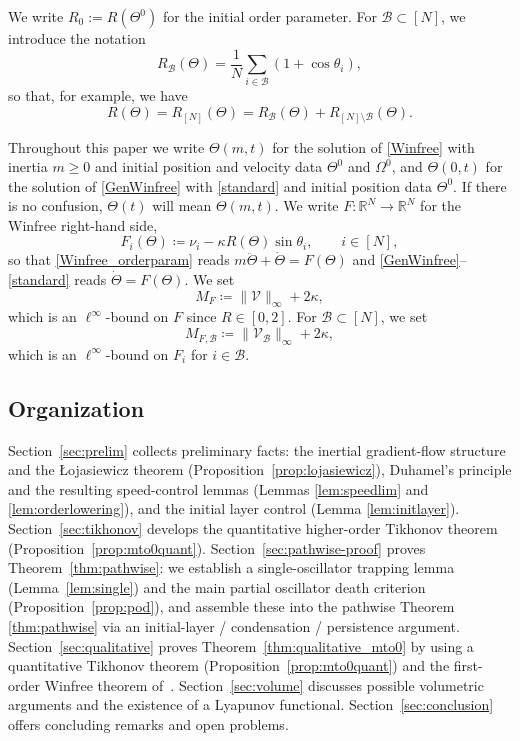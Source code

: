 \documentclass[11pt,reqno]{amsart}
\newcommand{\R}{\mathbb{R}}
\theoremstyle{definition}
\theoremstyle{remark}
\begin{document}
We write $R_0:=R(\Theta^0)$ for the initial order parameter. For $\mathcal{B}\subset [N]$, we introduce the notation
\[
R_\mathcal{B}(\Theta)=\frac 1N\sum_{i\in \mathcal{B}}(1+\cos\theta_i),
\]
so that, for example, we have
\begin{equation}\label{eq:order-parameter-split}
R(\Theta) = R_{[N]}(\Theta)= R_\mathcal{B}(\Theta) + R_{[N]\setminus \mathcal{B}}(\Theta).
\end{equation}

Throughout this paper we write $\Theta(m,t)$ for the solution of
\eqref{Winfree} with inertia $m\ge0$ and initial position and velocity data $\Theta^0$ and $\Omega^0$, and $\Theta(0,t)$ for the solution
of \eqref{GenWinfree} with \eqref{standard} and initial position data $\Theta^0$.  If there is no confusion, $\Theta(t)$ will mean $\Theta(m,t)$. We write
$F\colon\R^N\to\R^N$ for the Winfree right-hand side,
\begin{equation}\label{def:F}
F_i(\Theta)\coloneqq\nu_i-\kappa R(\Theta)\sin\theta_i,\qquad i\in[N],
\end{equation}
so that \eqref{Winfree_orderparam} reads
$m\ddot\Theta+\dot\Theta=F(\Theta)$ and \eqref{GenWinfree}--\eqref{standard}
reads $\dot\Theta=F(\Theta)$. We set
\begin{equation}\label{def:MFLF}
M_F\coloneqq\|\mathcal V\|_\infty+2\kappa,
\end{equation}
which is an
$\ell^\infty$-bound on $F$ since $R\in [0,2]$. For $\mathcal{B}\subset [N]$, we set
\begin{equation}\label{def:MFB}
M_{F,\mathcal{B}} \coloneqq \|\mathcal{V}_\mathcal{B}\|_\infty +2\kappa,
\end{equation}
which is an $\ell^\infty$-bound on $F_i$ for $i\in \mathcal{B}$.

\subsection{Organization}
Section~\ref{sec:prelim} collects preliminary facts: the inertial
gradient-flow structure and the \L ojasiewicz theorem
(Proposition~\ref{prop:lojasiewicz}), Duhamel's principle and the resulting speed-control lemmas (Lemmas \ref{lem:speedlim} and \ref{lem:orderlowering}), and the initial layer control (Lemma \ref{lem:initlayer}).
Section~\ref{sec:tikhonov} develops the quantitative higher-order
Tikhonov theorem
(Proposition~\ref{prop:mto0quant}). Section~\ref{sec:pathwise-proof}
proves Theorem~\ref{thm:pathwise}: we establish a single-oscillator trapping
lemma (Lemma~\ref{lem:single}) and the main partial oscillator death
criterion (Proposition~\ref{prop:pod}), and assemble these into the
pathwise Theorem \ref{thm:pathwise} via an initial-layer / condensation / persistence
argument. Section~\ref{sec:qualitative} proves
Theorem~\ref{thm:qualitative_mto0} by using
a quantitative Tikhonov theorem (Proposition~\ref{prop:mto0quant}) and the first-order Winfree theorem
of~\cite{ha2015emergence}. Section~\ref{sec:volume} discusses possible volumetric arguments and the existence of a Lyapunov functional. Section~\ref{sec:conclusion} offers
concluding remarks and open problems.
\end{document}
